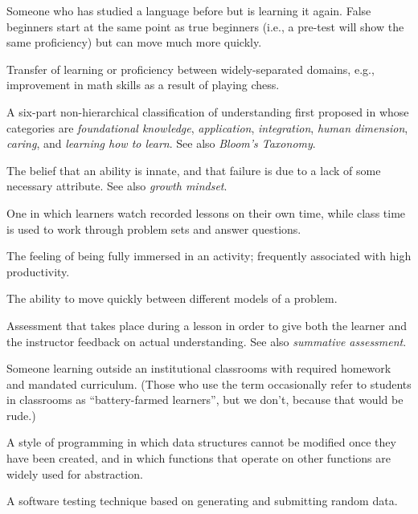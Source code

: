\begin{description}
 Someone who has studied a
language before but is learning it again.  False beginners start at
the same point as true beginners (i.e., a pre-test will show the same
proficiency) but can move much more quickly.

 Transfer of learning or
proficiency between widely-separated domains, e.g., improvement in
math skills as a result of playing chess.

 A six-part
non-hierarchical classification of understanding first proposed in
\cite{Fink2013} whose categories are \emph{foundational knowledge},
\emph{application}, \emph{integration}, \emph{human dimension},
\emph{caring}, and \emph{learning how to learn}. See also
\emph{Bloom's Taxonomy}.

 The belief that an ability
is innate, and that failure is due to a lack of some necessary
attribute. See also \emph{growth mindset}.

 One in which
learners watch recorded lessons on their own time, while class time is
used to work through problem sets and answer questions.

 The feeling of being fully immersed in an
activity; frequently associated with high productivity.

 The ability to
move quickly between different models of a problem.

 Assessment
that takes place during a lesson in order to give both the learner and
the instructor feedback on actual understanding. See also
\emph{summative assessment}.

 Someone learning
outside an institutional classrooms with required homework and
mandated curriculum.  (Those who use the term occasionally refer to
students in classrooms as ``battery-farmed learners'', but we don't,
because that would be rude.)

 A style
of programming in which data structures cannot be modified once they
have been created, and in which functions that operate on other
functions are widely used for abstraction.

 A software testing technique
based on generating and submitting random data.


\end{description}
